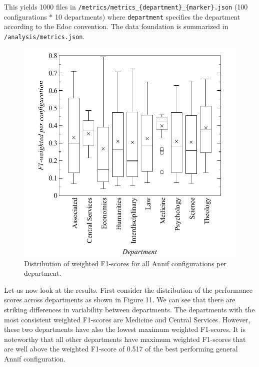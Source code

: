 \begin{Shaded}
\begin{Highlighting}[]
\end{Highlighting}
\end{Shaded}

This yields 1000 files in
\texttt{/metrics/metrics\_\{department\}\_\{marker\}.json} (100
configurations \(*\) 10 departments) where \texttt{department} specifies
the department according to the Edoc convention. The data foundation is
summarized in \texttt{/analysis/metrics.json}.

\begin{figure}
\centering
\includegraphics{images/metrics_dept_distribution.pdf}
\caption{Distribution of weighted F1-scores for all Annif configurations
per department.}
\end{figure}

Let us now look at the results. First consider the distribution of the
performance scores across departments as shown in Figure 11. We can see
that there are striking differences in variability between departments.
The departments with the most consistent weighted F1-scores are Medicine
and Central Services. However, these two departments have also the
lowest maximum weighted F1-scores. It is noteworthy that all other
departments have maximum weighted F1-scores that are well above the
weighted F1-score of 0.517 of the best performing general Annif
configuration.

